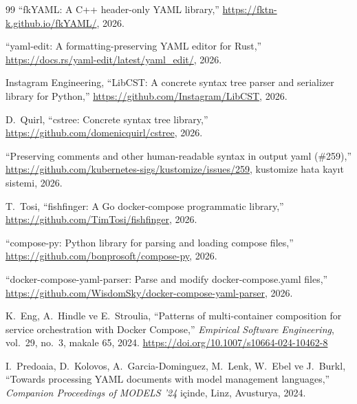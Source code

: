 \documentclass[conference]{IEEEtran}
\begin{document}
\begin{thebibliography}{99}
``fk{YAML}: A {C++} header-only {YAML} library,'' \url{https://fktn-k.github.io/fkYAML/}, 2026.

``yaml-edit: A formatting-preserving {YAML} editor for {Rust},'' \url{https://docs.rs/yaml-edit/latest/yaml_edit/}, 2026.

Instagram Engineering, ``{LibCST}: A concrete syntax tree parser and serializer library for {Python},'' \url{https://github.com/Instagram/LibCST}, 2026.

D.~Quirl, ``cstree: Concrete syntax tree library,'' \url{https://github.com/domenicquirl/cstree}, 2026.

``Preserving comments and other human-readable syntax in output yaml (\#259),'' \url{https://github.com/kubernetes-sigs/kustomize/issues/259}, kustomize hata kayıt sistemi, 2026.

T.~Tosi, ``fishfinger: A {Go} docker-compose programmatic library,'' \url{https://github.com/TimTosi/fishfinger}, 2026.

``compose-py: {Python} library for parsing and loading compose files,'' \url{https://github.com/bonprosoft/compose-py}, 2026.

``docker-compose-yaml-parser: Parse and modify docker-compose.yaml files,'' \url{https://github.com/WisdomSky/docker-compose-yaml-parser}, 2026.

K.~Eng, A.~Hindle ve E.~Stroulia, ``Patterns of multi-container composition for service orchestration with {Docker Compose},'' \emph{Empirical Software Engineering}, vol.~29, no.~3, makale 65, 2024. \url{https://doi.org/10.1007/s10664-024-10462-8}

I.~Predoaia, D.~Kolovos, A.~Garcia-Dominguez, M.~Lenk, W.~Ebel ve J.~Burkl, ``Towards processing {YAML} documents with model management languages,'' \emph{Companion Proceedings of MODELS '24} içinde, Linz, Avusturya, 2024.
\end{thebibliography}
\end{document}
